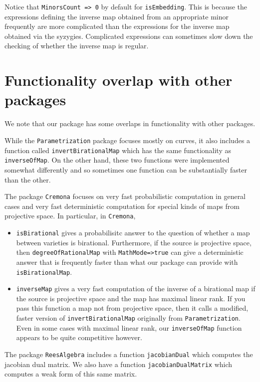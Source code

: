 \documentclass[11pt]{amsart}
\numberwithin{equation}{theorem}
\renewcommand{\:}{\colon}
\theoremstyle{theorem}
\begin{document}
{\color{black}\normalsize%
\noindent
Notice that {\tt MinorsCount => 0} by default for {\tt isEmbedding}.  This is because the expressions defining the inverse map obtained from
an appropriate minor frequently are more complicated than the expressions for the inverse map obtained via the syzygies.  Complicated expressions can sometimes slow down the checking of whether the inverse map is regular.

\section{Functionality overlap with other packages}

We note that our package has some overlaps in functionality with other packages.

While the {\tt Parametrization} package \cite{ParametrizationPackage} focuses mostly on curves, it also includes a function called {\tt invertBirationalMap} which has the same functionality as {\tt inverseOfMap}. On the other hand, these two functions were implemented somewhat differently and so sometimes one function can be substantially faster than the other.

The package {\tt Cremona} \cite{CremonaSource,CremonaArticle} focuses on very fast probabilistic computation in general cases and very fast deterministic computation for special kinds of maps from projective space. In particular, in {\tt Cremona},

\begin{itemize}
\item{}     {\tt isBirational} gives a probabilisitc answer to the question of whether a map between varieties is birational. Furthermore, if the source is projective space, then {\tt degreeOfRationalMap} with {\tt MathMode=>true} can give a deterministic answer that is frequently faster than what our package can provide with {\tt isBirationalMap}.
\item{}  {\tt inverseMap} gives a very fast computation of the inverse of a birational map if the source is projective space and the map has maximal linear rank. If you pass this function a map not from projective space, then it calls a modified, faster version of {\tt invertBirationalMap} originally from {\tt Parametrization}. Even in some cases with maximal linear rank, our {\tt inverseOfMap} function appears to be quite competitive however.
\end{itemize}

The package {\tt ReesAlgebra} \cite{ReesAlgebraSource, ReesAlgebraArticle} includes a function {\tt jacobianDual} which computes the jacobian dual matrix.  We also have a function {\tt jacobianDualMatrix} which computes a weak form of this same matrix.

}
\end{document}
